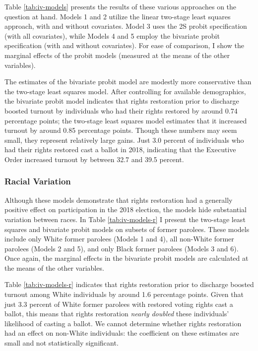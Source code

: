 \documentclass[
  12pt,
]{article}
\begin{document}
Table \ref{tab:iv-models} presents the results of these various approaches on the question at hand. Models 1 and 2 utilize the linear two-stage least squares approach, with and without covariates. Model 3 uses the 2S probit specification (with all covariates), while Models 4 and 5 employ the bivariate probit specification (with and without covariates). For ease of comparison, I show the marginal effects of the probit models (measured at the means of the other variables).



The estimates of the bivariate probit model are modestly more conservative than the two-stage least squares model. After controlling for available demographics, the bivariate probit model indicates that rights restoration prior to discharge boosted turnout by individuals who had their rights restored by around 0.74 percentage points; the two-stage least squares model estimates that it increased turnout by around 0.85 percentage points. Though these numbers may seem small, they represent relatively large gains. Just 3.0 percent of individuals who had their rights restored cast a ballot in 2018, indicating that the Executive Order increased turnout by between 32.7 and 39.5 percent.

\hypertarget{racial-variation}{%
\subsubsection*{Racial Variation}\label{racial-variation}}

Although these models demonstrate that rights restoration had a generally positive effect on participation in the 2018 election, the models hide substantial variation between races. In Table \ref{tab:iv-models-r} I present the two-stage least squares and bivariate probit models on subsets of former parolees. These models include only White former parolees (Models 1 and 4), all non-White former parolees (Models 2 and 5), and only Black former parolees (Models 3 and 6). Once again, the marginal effects in the bivariate probit models are calculated at the means of the other variables.



Table \ref{tab:iv-models-r} indicates that rights restoration prior to discharge boosted turnout among White individuals by around 1.6 percentage points. Given that just 3.3 percent of White former parolees with restored voting rights cast a ballot, this means that rights restoration \emph{nearly doubled} these individuals' likelihood of casting a ballot. We cannot determine whether rights restoration had an effect on non-White individuals: the coefficient on these estimates are small and not statistically significant.
\end{document}
